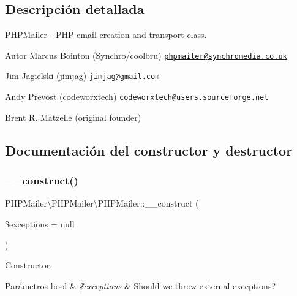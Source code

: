 \subsection{Descripción detallada}
\hyperlink{classPHPMailer_1_1PHPMailer_1_1PHPMailer}{P\+H\+P\+Mailer} -\/ P\+HP email creation and transport class.

\begin{DoxyAuthor}{Autor}
Marcus Bointon (Synchro/coolbru) \href{mailto:phpmailer@synchromedia.co.uk}{\tt phpmailer@synchromedia.\+co.\+uk} 

Jim Jagielski (jimjag) \href{mailto:jimjag@gmail.com}{\tt jimjag@gmail.\+com} 

Andy Prevost (codeworxtech) \href{mailto:codeworxtech@users.sourceforge.net}{\tt codeworxtech@users.\+sourceforge.\+net} 

Brent R. Matzelle (original founder) 
\end{DoxyAuthor}


\subsection{Documentación del constructor y destructor}
\mbox{\label{classPHPMailer_1_1PHPMailer_1_1PHPMailer_a29c8ddd01ae18fa75d02e14005efce22}} 
\subsubsection{\texorpdfstring{\+\_\+\+\_\+construct()}{\_\_construct()}}
{\footnotesize\ttfamily P\+H\+P\+Mailer\textbackslash{}\+P\+H\+P\+Mailer\textbackslash{}\+P\+H\+P\+Mailer\+::\+\_\+\+\_\+construct (\begin{DoxyParamCaption}\item[{}]{\$exceptions = {\ttfamily null} }\end{DoxyParamCaption})}

Constructor.


\begin{DoxyParams}[1]{Parámetros}
bool & {\em \$exceptions} & Should we throw external exceptions? \\
\hline
\end{DoxyParams}
\mbox{\label{classPHPMailer_1_1PHPMailer_1_1PHPMailer_ae6d9332d9dab73c4745740248e117023}} 
